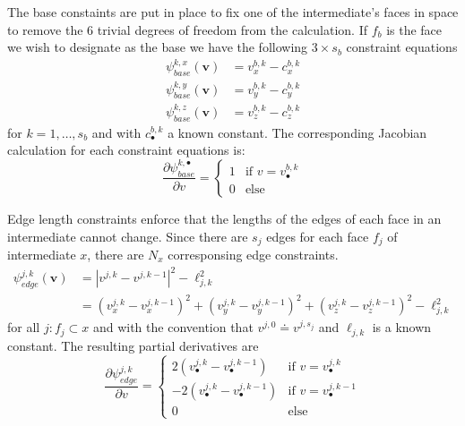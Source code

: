 The base constaints are put in place to fix one of the intermediate's faces in space to remove the 6 trivial degrees of freedom from the calculation. If $f_b$ is the face we wish to designate as the base we have the following $3\times s_b$ constraint equations
\begin{align}
\psi_{base}^{k,x}\left(\mathbf{v}\right)& = v^{b,k}_x - c^{b,k}_x \\
\psi_{base}^{k,y}\left(\mathbf{v}\right)& = v^{b,k}_y - c^{b,k}_y \\
\psi_{base}^{k,z}\left(\mathbf{v}\right)& = v^{b,k}_z - c^{b,k}_z
\end{align}  
for $k = 1,\dots,s_b$ and with $c^{b,k}_\bullet$ a known constant. The corresponding Jacobian calculation for each constraint equations is:
\[
\frac{\partial\psi_{base}^{k,\bullet}}{\partial v} =
  \begin{cases}
   1 & \text{if } v = v^{b,k}_\bullet \\
   0       & \text{else} 
  \end{cases}
\]

Edge length constraints enforce that the lengths of the edges of each face in an intermediate cannot change. Since there are $s_j$ edges for each face $f_j$ of intermediate $x$, there are $N_x$ corresponsing edge constraints. 
\begin{align}
\psi_{edge}^{j,k}\left(\mathbf{v}\right)& = \left|v^{j,k} - v^{j,k-1}\right|^2 - \ell_{j,k}^2 \\
& = \left(v_x^{j,k} - v_x^{j,k-1}\right)^2 +\left(v_y^{j,k} - v_y^{j,k-1}\right)^2 +\left(v_z^{j,k} - v_z^{j,k-1}\right)^2 - \ell_{j,k}^2 
\end{align}  
for all $j: f_j \subset x$ and with the convention that $v^{j,0} \doteq v^{j,s_j}$ and $\ell_{j,k}$ is a known constant. The resulting partial derivatives are
\[
	\frac{\partial\psi_{edge}^{j,k}}{\partial v} =
  	\begin{cases}
        	2\left(v^{j,k}_\bullet-v^{j,k-1}_\bullet\right) 	& \text{if } v = v^{j,k}_\bullet \\
   		-2\left(v^{j,k}_\bullet-v^{j,k-1}_\bullet\right) 	& \text{if } v = v^{j,k-1}_\bullet \\
   		0       & \text{else} 
  	\end{cases}
\]

